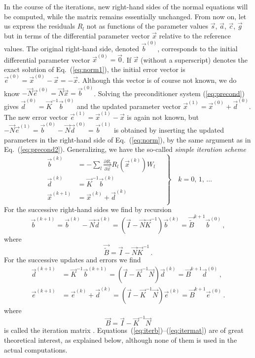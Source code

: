 \documentclass[structabstract]{aa}
\begin{document}
In the course of the iterations, new right-hand sides of the normal
equations will be computed, while the matrix remains essentially unchanged.
From now on, let us express the residuals $R_l$ not as functions of the
parameter values $\vec{s}$, $\vec{a}$, $\vec{c}$, $\vec{g}$ but in terms 
of the differential parameter vector $\vec{x}$ relative to the reference values.
The original right-hand side, denoted $\vec{b}^{(0)}$, corresponds to
the initial differential parameter vector $\vec{x}^{(0)}=\vec{0}$. 
If $\vec{x}$ (without a superscript) denotes the exact solution of 
Eq.~(\ref{eq:norm1}), the initial error vector is 
$\vec{e}^{(0)}=\vec{x}^{(0)}-\vec{x}=-\vec{x}$. Although this
vector is of course not known, we do know
$-\vec{N}\vec{e}^{(0)}=\vec{N}\vec{x}=\vec{b}^{(0)}$.
Solving the preconditioner system (\ref{eq:precond}) gives
$\vec{d}^{(0)}=\vec{K}^{-1}\vec{b}^{(0)}$ and the updated parameter vector
$\vec{x}^{(1)}=\vec{x}^{(0)}+\vec{d}^{(0)}$. The new error vector 
$\vec{e}^{(1)}=\vec{x}^{(1)}-\vec{x}$ is again not known, but
$-\vec{N}\vec{e}^{(1)}=\vec{b}^{(0)}-\vec{N}\vec{d}^{(0)}=\vec{b}^{(1)}$
is obtained by inserting the updated parameters in the right-hand side
of Eq.~(\ref{eq:norm}), by the same argument as in Eq.~(\ref{eq:precond2}).
Generalizing, we have the so-called \emph{simple iteration scheme}
\begin{equation}\label{eq:iter}
\left.
\begin{aligned}
\vec{b}^{(k)} &= -\sum_l \frac{\partial R_l}{\partial\vec{x}}
R_l(\vec{x}^{(k)})W_l\quad \\
\vec{d}^{(k)} &= \vec{K}^{-1}\vec{b}^{(k)}\\
\vec{x}^{(k+1)} &= \vec{x}^{(k)}+\vec{d}^{(k)}\\
\end{aligned}
\right\} \quad k=0,\,1,\,\dots
\end{equation}
For the successive right-hand sides we find by recursion
\begin{equation}\label{eq:iterb}
\vec{b}^{(k+1)} = \vec{b}^{(k)} - \vec{N}\vec{d}^{(k)}
= (\vec{I}-\vec{N}\vec{K}^{-1})\vec{b}^{(k)}
= \vec{\tilde{B}}^{k+1}\vec{b}^{(0)} \, ,
\end{equation}
where
\begin{equation}\label{eq:iterbmat}
\vec{\tilde{B}} = \vec{I}-\vec{N}\vec{K}^{-1} \, .
\end{equation}
For the successive updates and errors we find
\begin{align}
\vec{d}^{(k+1)} &= \vec{K}^{-1}\vec{b}^{(k+1)}
= (\vec{I}-\vec{K}^{-1}\vec{N})\vec{d}^{(k)}
= \vec{B}^{k+1}\vec{d}^{(0)} \, ,\label{eq:iterx} \\
\vec{e}^{(k+1)} &= \vec{e}^{(k)}+\vec{d}^{(k)}
= (\vec{I}-\vec{K}^{-1}\vec{N})\vec{e}^{(k)}
= \vec{B}^{k+1}\vec{e}^{(0)} \, . \label{eq:itere}
\end{align}
where
\begin{equation}\label{eq:itermat}
\vec{B}=\vec{I}-\vec{K}^{-1}\vec{N}
\end{equation}
is called the iteration matrix \citep{axelsson96}.
Equations~(\ref{eq:iterb})--(\ref{eq:itermat}) are of great theoretical
interest, as explained below, although none of them is used
in the actual computations.
\end{document}
